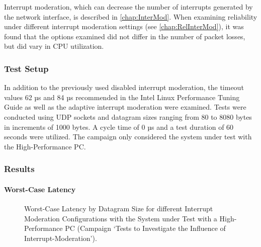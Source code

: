 Interrupt moderation, which can decrease the number of interrupts generated by the network interface, is described in \ref{chap:InterMod}. When examining reliability under different interrupt moderation settings (see \ref{chap:RelInterMod}), it was found that the options examined did not differ in the number of packet losses, but did vary in \ac{CPU} utilization.

\subsubsection{Test Setup}
In addition to the previously used disabled interrupt moderation, the timeout values 62 µs and 84 µs recommended in the Intel Linux Performance Tuning Guide \cite{intermod03} as well as the adaptive interrupt moderation were examined. Tests were conducted using UDP sockets and datagram sizes ranging from 80 to 8080 bytes in increments of 1000 bytes. A cycle time of 0 µs and a test duration of 60 seconds were utilized. The campaign only considered the system under test with the High-Performance PC.

\subsubsection{Results}
\paragraph{Worst-Case Latency}

\begin{figure}[h!]
  \centering
  \caption{Worst-Case Latency by Datagram Size for different Interrupt Moderation Configurations with the System under Test with a High-Performance PC (Campaign `Tests to Investigate the Influence of Interrupt-Moderation').}
  \label{fig:IMWc}
\end{figure}

